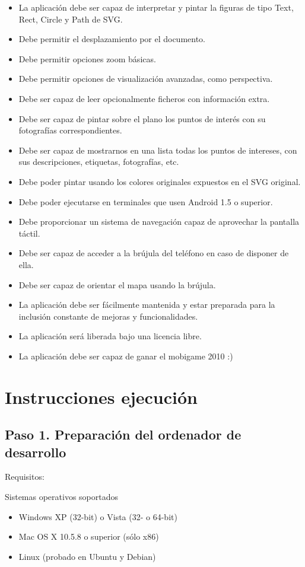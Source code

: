 \documentclass[a4paper,10pt]{article}
\begin{document}
\begin{itemize}
\item La aplicación debe ser capaz de interpretar y pintar la figuras de tipo Text, Rect, 
Circle y Path de SVG.
\item Debe permitir el desplazamiento por el documento.
\item Debe permitir opciones zoom básicas.
\item Debe permitir opciones de visualización avanzadas, como perspectiva.
\item Debe ser capaz de leer opcionalmente ficheros con información extra.
\item Debe ser capaz de pintar sobre el plano los puntos de interés con su fotografías correspondientes.
\item Debe ser capaz de mostrarnos en una lista todas los puntos de intereses, con sus descripciones, etiquetas, fotografías, etc.
\item Debe poder pintar usando los colores originales expuestos en el SVG original.
\item Debe poder ejecutarse en terminales que usen Android 1.5 o superior.
\item Debe proporcionar un sistema de navegación capaz de aprovechar la pantalla táctil.
\item Debe ser capaz de acceder a la brújula del teléfono en caso de disponer de ella.
\item Debe ser capaz de orientar el mapa usando la brújula.
\item La aplicación debe ser fácilmente mantenida y estar preparada para la inclusión constante de mejoras y funcionalidades.
\item La aplicación será liberada bajo una licencia libre.
\item La aplicación debe ser capaz de ganar el mobigame 2010 :)
\end{itemize}

\section{Instrucciones ejecución}
\subsection{Paso 1. Preparación del ordenador de desarrollo}
Requisitos:

Sistemas operativos soportados
\begin{itemize}
\item Windows XP (32-bit) o Vista (32- o 64-bit)
\item Mac OS X 10.5.8 o superior (sólo x86)
\item Linux (probado en Ubuntu y Debian)
\end{itemize}
\end{document}
